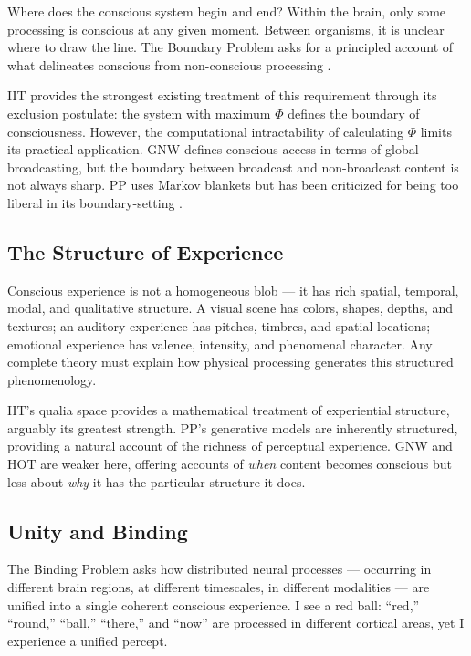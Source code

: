 \documentclass[12pt]{article}
\begin{document}
Where does the conscious system begin and end? Within the brain, only some processing is conscious at any given moment. Between organisms, it is unclear where to draw the line. The Boundary Problem asks for a principled account of what delineates conscious from non-conscious processing \citep[see][]{Bayne2010,Tononi2004}.

IIT provides the strongest existing treatment of this requirement through its exclusion postulate: the system with maximum $\Phi$ defines the boundary of consciousness. However, the computational intractability of calculating $\Phi$ limits its practical application. GNW defines conscious access in terms of global broadcasting, but the boundary between broadcast and non-broadcast content is not always sharp. PP uses Markov blankets \citep{Friston2010} but has been criticized for being too liberal in its boundary-setting \citep{Bruineberg2022}.


\subsection{The Structure of Experience}


Conscious experience is not a homogeneous blob --- it has rich spatial, temporal, modal, and qualitative structure. A visual scene has colors, shapes, depths, and textures; an auditory experience has pitches, timbres, and spatial locations; emotional experience has valence, intensity, and phenomenal character. Any complete theory must explain how physical processing generates this structured phenomenology.

IIT's qualia space provides a mathematical treatment of experiential structure, arguably its greatest strength. PP's generative models are inherently structured, providing a natural account of the richness of perceptual experience. GNW and HOT are weaker here, offering accounts of \emph{when} content becomes conscious but less about \emph{why} it has the particular structure it does.


\subsection{Unity and Binding}


The Binding Problem \citep{Treisman1996,Revonsuo1999} asks how distributed neural processes --- occurring in different brain regions, at different timescales, in different modalities --- are unified into a single coherent conscious experience. I see a red ball: ``red,'' ``round,'' ``ball,'' ``there,'' and ``now'' are processed in different cortical areas, yet I experience a unified percept.
\end{document}

